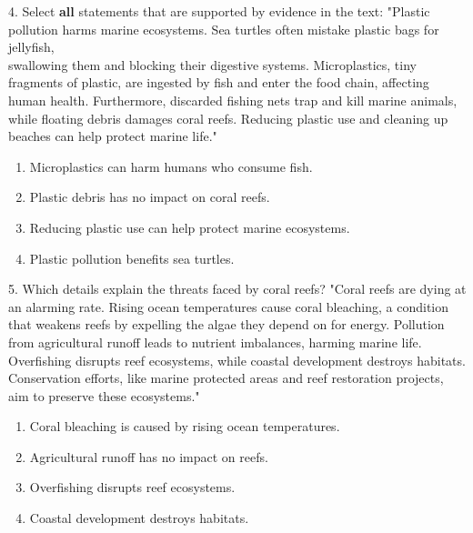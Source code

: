 \documentclass[12pt]{article}
\begin{document}
4. Select \textbf{all} statements that are supported by evidence in the text:  
"Plastic pollution harms marine ecosystems. Sea turtles often mistake plastic bags for jellyfish, \\swallowing them and blocking their digestive systems. Microplastics, tiny fragments of plastic, are ingested by fish and enter the food chain, affecting human health. Furthermore, discarded fishing nets trap and kill marine animals, while floating debris damages coral reefs. Reducing plastic use and cleaning up beaches can help protect marine life."  
\begin{enumerate}[label=\Alph*.]
    \item Microplastics can harm humans who consume fish.  
    \item Plastic debris has no impact on coral reefs.  
    \item Reducing plastic use can help protect marine ecosystems.  
    \item Plastic pollution benefits sea turtles.  
\end{enumerate}

\vspace{1cm}

5. Which details explain the threats faced by coral reefs?  
"Coral reefs are dying at an alarming rate. Rising ocean temperatures cause coral bleaching, a condition that weakens reefs by expelling the algae they depend on for energy. Pollution from agricultural runoff leads to nutrient imbalances, harming marine life. Overfishing disrupts reef ecosystems, while coastal development destroys habitats. Conservation efforts, like marine protected areas and reef restoration projects, aim to preserve these ecosystems."  
\begin{enumerate}[label=\Alph*.]
    \item Coral bleaching is caused by rising ocean temperatures.  
    \item Agricultural runoff has no impact on reefs.  
    \item Overfishing disrupts reef ecosystems.  
    \item Coastal development destroys habitats.  
\end{enumerate}

\vspace{1cm}
\end{document}
